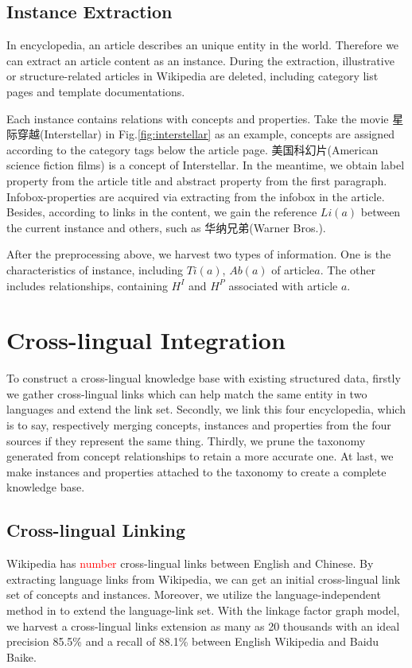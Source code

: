 \documentclass[runningheads,a4paper]{llncs}
\begin{document}
\subsection{Instance Extraction}
\label{sec:ie}
In encyclopedia, an article describes an unique entity in the world. Therefore we can extract an article content as an instance. During the extraction, illustrative or structure-related articles in Wikipedia are deleted, including category list pages and template documentations.

Each instance contains relations with concepts and properties. Take the movie 星际穿越(Interstellar) in Fig.\ref{fig:interstellar} as an example, concepts are assigned according to the category tags below the article page. 美国科幻片(American science fiction films) is a concept of Interstellar. In the meantime, we obtain label property from the article title and abstract property from the first paragraph. Infobox-properties are acquired via extracting from the infobox in the article. Besides, according to links in the content, we gain the reference $Li(a)$ between the current instance and others, such as 华纳兄弟(Warner Bros.).

After the preprocessing above, we harvest two types of information. One is the characteristics of instance, including $Ti(a)$, $Ab(a)$ of article$a$. The other includes relationships, containing $H^I$ and $H^P$ associated with article $a$.

\section{Cross-lingual Integration}
\label{sec:clkbb}
To construct a cross-lingual knowledge base with existing structured data, firstly we gather cross-lingual links which can help match the same entity in two languages and extend the link set. Secondly, we link this four encyclopedia, which is to say, respectively merging concepts, instances and properties from the four sources if they represent the same thing. Thirdly, we prune the taxonomy generated from concept relationships to retain a more accurate one. At last, we make instances and properties attached to the taxonomy to create a complete knowledge base.

\subsection{Cross-lingual Linking}
Wikipedia has \textcolor{red}{number} cross-lingual links between English and Chinese. By extracting language links from Wikipedia, we can get an initial cross-lingual link set of concepts and instances. Moreover, we utilize the language-independent method in \cite{wang2012cross} to extend the language-link set. With the linkage factor graph model, we harvest a cross-lingual links extension as many as 20 thousands with an ideal precision 85.5\% and a recall of 88.1\% between English Wikipedia and Baidu Baike.
\end{document}
